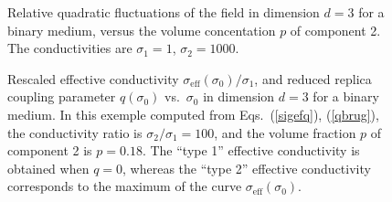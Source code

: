 \begin{figure}
\narrowtext
\vspace*{0.0cm}
\centerline{ }
\vspace*{0.3cm}
\caption{Relative quadratic fluctuations of the field in dimension $d=3$ for a binary medium, versus the volume concentation $p$ of component 2. The conductivities are $\sigma_1=1$, $\sigma_2=1000$. }
\label{fig5}
\end{figure}

\begin{figure}
\narrowtext
\vspace*{0.0cm}
\centerline{ }
\vspace*{0.3cm}
\caption{Rescaled effective conductivity  $\sigma_{\text{eff}}(\sigma_0)/\sigma_1$, and reduced replica coupling parameter $q(\sigma_0)$ vs.\ $\sigma_0$ in dimension $d=3$ for a binary medium. In this exemple computed  from Eqs.\ (\ref{sigefq}), (\ref{qbrug}), the conductivity ratio is  $\sigma_2/\sigma_1=100$, and the volume fraction $p$ of  component 2 is $p=0.18$. The ``type 1'' effective conductivity is obtained when $q=0$, whereas the ``type 2'' effective conductivity corresponds to the maximum of the curve $\sigma_{\text{eff}}(\sigma_0)$. }
\label{fig6}
\end{figure}

